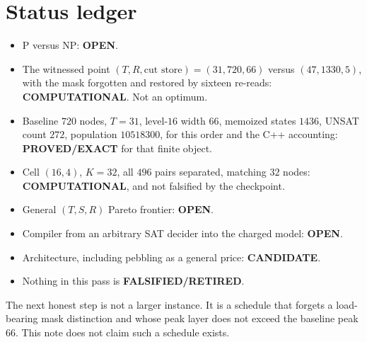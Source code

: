 \documentclass[11pt]{article}
\begin{document}
\section{Status ledger}
\begin{itemize}
\item P versus NP: \textbf{OPEN}.
\item The witnessed point \((T,R,\text{cut store})=(31,720,66)\) versus \((47,1330,5)\), with the mask forgotten and restored by sixteen re-reads: \textbf{COMPUTATIONAL}. Not an optimum.
\item Baseline \(720\) nodes, \(T=31\), level-\(16\) width \(66\), memoized states \(1436\), UNSAT count \(272\), population \(10518300\), for this order and the C++ accounting: \textbf{PROVED/EXACT} for that finite object.
\item Cell \((16,4)\), \(K=32\), all \(496\) pairs separated, matching \(32\) nodes: \textbf{COMPUTATIONAL}, and not falsified by the checkpoint.
\item General \((T,S,R)\) Pareto frontier: \textbf{OPEN}.
\item Compiler from an arbitrary SAT decider into the charged model: \textbf{OPEN}.
\item Architecture, including pebbling as a general price: \textbf{CANDIDATE}.
\item Nothing in this pass is \textbf{FALSIFIED/RETIRED}.
\end{itemize}

The next honest step is not a larger instance.
It is a schedule that forgets a load-bearing mask distinction and whose peak layer does not exceed the baseline peak \(66\).
This note does not claim such a schedule exists.

\end{document}
